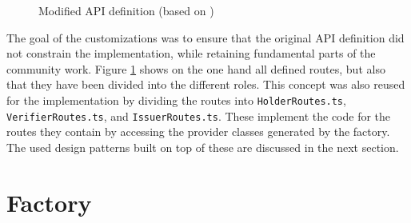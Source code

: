     \begin{figure}[ht]
        \centering
        \caption[Modified API definition]{Modified API definition (based on \cite{world_wide_web_consortium_credentials_community_group_vc_2021})}
        \label{figure: api definition}
    \end{figure}
    
    
    The goal of the customizations was to ensure that the original API definition did not constrain the implementation, while retaining fundamental parts of the community work. Figure \ref{figure: api definition} shows on the one hand all defined routes, but also that they have been divided into the different roles. This concept was also reused for the implementation by dividing the routes into \texttt{HolderRoutes.ts}, \texttt{VerifierRoutes.ts}, and \texttt{IssuerRoutes.ts}. These implement the code for the routes they contain by accessing the provider classes generated by the factory. The used design patterns built on top of these are discussed in the next section. 
    \vfill

        
    \section{Factory}
    
